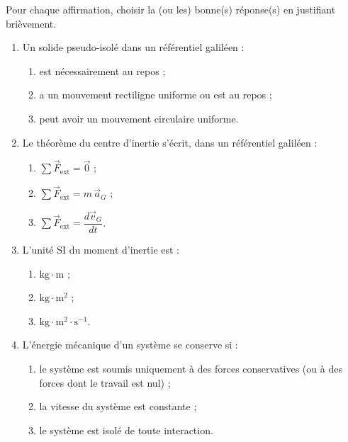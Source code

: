 \documentclass[11pt]{article}
\begin{document}
\begin{exercice}
Pour chaque affirmation, choisir la (ou les) bonne(s) réponse(s) en justifiant brièvement.
\begin{enumerate}
\item Un solide pseudo-isolé dans un référentiel galiléen :
\begin{enumerate}
\item est nécessairement au repos ;
\item a un mouvement rectiligne uniforme ou est au repos ;
\item peut avoir un mouvement circulaire uniforme.
\end{enumerate}
\item Le théorème du centre d'inertie s'écrit, dans un référentiel galiléen :
\begin{enumerate}
\item $\sum \vec{F}_{\mathrm{ext}} = \vec{0}$ ;
\item $\sum \vec{F}_{\mathrm{ext}} = m\,\vec{a}_G$ ;
\item $\sum \vec{F}_{\mathrm{ext}} = \dfrac{d\vec{v}_G}{dt}$.
\end{enumerate}
\item L'unité SI du moment d'inertie est :
\begin{enumerate}
\item $\mathrm{kg\cdot m}$ ;
\item $\mathrm{kg\cdot m^2}$ ;
\item $\mathrm{kg\cdot m^2\cdot s^{-1}}$.
\end{enumerate}
\item L'énergie mécanique d'un système se conserve si :
\begin{enumerate}
\item le système est soumis uniquement à des forces conservatives (ou à des forces dont le travail est nul) ;
\item la vitesse du système est constante ;
\item le système est isolé de toute interaction.
\end{enumerate}
\end{enumerate}
\end{exercice}
\end{document}
